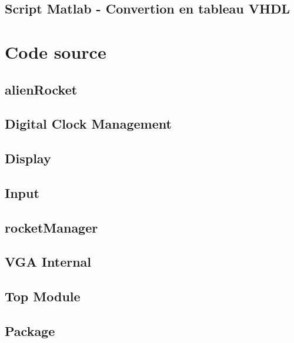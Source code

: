 \documentclass[french]{nakrule}
\begin{document}
\subsection{Script Matlab - Convertion en tableau VHDL}
\label{subsec:Script2}
\vspace{.1in}


\clearpage

\section{Code source}
\label{sec:code}

\subsection{alienRocket}


\clearpage
\subsection{Digital Clock Management}

\clearpage
\subsection{Display}

\clearpage
\subsection{Input}


\subsection{rocketManager}


\subsection{VGA Internal}

\clearpage
\subsection{Top Module}


\subsection{Package}

\end{document}
